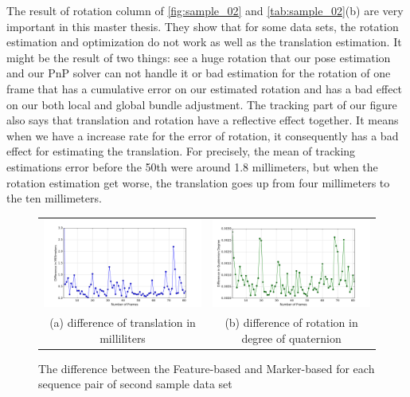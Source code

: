 The result of rotation column of \autoref{fig:sample_02} and \autoref{tab:sample_02}(b) are very important in this master thesis. They show that for some data sets, the rotation estimation and optimization do not work as well as the translation estimation. It might be the result of two things: see a huge rotation that our pose estimation and our PnP solver can not handle it or bad estimation for the rotation of one frame that has a cumulative error on our estimated rotation and has a bad effect on our both local and global bundle adjustment. The tracking part of our figure also says that translation and rotation have a reflective effect together. It means when we have a increase rate for the error of rotation, it consequently has a bad effect for estimating the translation. For precisely, the mean of tracking estimations error before the 50th were around 1.8 millimeters, but when the rotation estimation get worse, the translation goes up from four millimeters to the ten millimeters.

\begin{figure}[H]
\begin{tabular}{cc}
  \includegraphics[width=80mm]{figures/diff_400/graph_translation} &  \includegraphics[width=80mm]{figures/diff_400/graph_rotation} \\
(a) difference of translation in milliliters & (b) difference of rotation in degree of quaternion \\[6pt]
\end{tabular}
\caption{The difference between the Feature-based and Marker-based for each sequence pair of second sample data set}\label{fig:sample_02_diff}
\end{figure}

